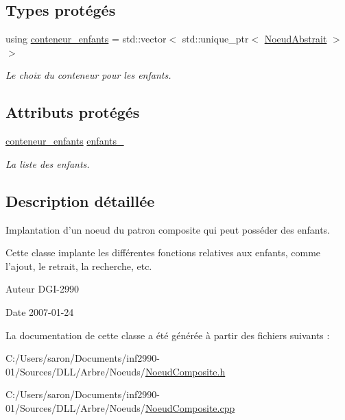 \subsection*{Types protégés}
\begin{DoxyCompactItemize}
\item 
\hypertarget{class_noeud_composite_ac12bde5084b853e81fa3f7560e8ffeaf}{using \hyperlink{class_noeud_composite_ac12bde5084b853e81fa3f7560e8ffeaf}{conteneur\-\_\-enfants} = std\-::vector$<$ std\-::unique\-\_\-ptr$<$ \hyperlink{class_noeud_abstrait}{Noeud\-Abstrait} $>$$>$}\label{class_noeud_composite_ac12bde5084b853e81fa3f7560e8ffeaf}

\begin{DoxyCompactList}\small\item\em Le choix du conteneur pour les enfants. \end{DoxyCompactList}\end{DoxyCompactItemize}
\subsection*{Attributs protégés}
\begin{DoxyCompactItemize}
\item 
\hypertarget{class_noeud_composite_a628227fd324020e497ada7577457ff3f}{\hyperlink{class_noeud_composite_ac12bde5084b853e81fa3f7560e8ffeaf}{conteneur\-\_\-enfants} \hyperlink{class_noeud_composite_a628227fd324020e497ada7577457ff3f}{enfants\-\_\-}}\label{class_noeud_composite_a628227fd324020e497ada7577457ff3f}

\begin{DoxyCompactList}\small\item\em La liste des enfants. \end{DoxyCompactList}\end{DoxyCompactItemize}


\subsection{Description détaillée}
Implantation d'un noeud du patron composite qui peut posséder des enfants. 

Cette classe implante les différentes fonctions relatives aux enfants, comme l'ajout, le retrait, la recherche, etc.

\begin{DoxyAuthor}{Auteur}
D\-G\-I-\/2990 
\end{DoxyAuthor}
\begin{DoxyDate}{Date}
2007-\/01-\/24 
\end{DoxyDate}


La documentation de cette classe a été générée à partir des fichiers suivants \-:\begin{DoxyCompactItemize}
\item 
C\-:/\-Users/saron/\-Documents/inf2990-\/01/\-Sources/\-D\-L\-L/\-Arbre/\-Noeuds/\hyperlink{_noeud_composite_8h}{Noeud\-Composite.\-h}\item 
C\-:/\-Users/saron/\-Documents/inf2990-\/01/\-Sources/\-D\-L\-L/\-Arbre/\-Noeuds/\hyperlink{_noeud_composite_8cpp}{Noeud\-Composite.\-cpp}\end{DoxyCompactItemize}
